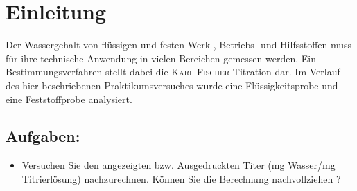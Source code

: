 %
\pagebreak
\section{Einleitung}
\label{sec:einleitung}
Der Wassergehalt von flüssigen und festen Werk-, Betriebs- und Hilfsstoffen muss für ihre technische Anwendung in vielen Bereichen gemessen werden. Ein Bestimmungsverfahren stellt dabei die \textsc{Karl-Fischer}-Titration dar. Im Verlauf des hier beschriebenen Praktikumsversuches wurde eine Flüssigkeitsprobe und eine Feststoffprobe analysiert.
\subsection{Aufgaben:}
\begin{itemize}
	\item Versuchen Sie den angezeigten bzw. Ausgedruckten Titer (mg Wasser/mg Titrierlösung) nachzurechnen. Können Sie die Berechnung nachvollziehen ?
\end{itemize}





